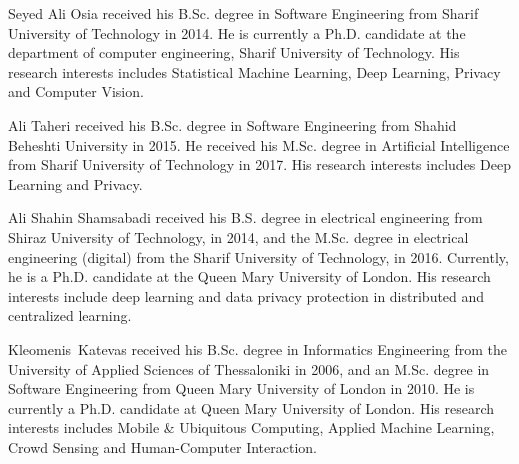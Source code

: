 \documentclass[10pt,journal,compsoc]{IEEEtran}
\begin{document}
\begin{IEEEbiography}{Seyed Ali Osia}
	received his B.Sc. degree in Software Engineering from Sharif University of Technology in 2014. He is currently a Ph.D. candidate at the department of computer engineering, Sharif University of Technology. His research interests includes Statistical Machine Learning, Deep Learning, Privacy and Computer Vision. 
\end{IEEEbiography}
\begin{IEEEbiography}{Ali Taheri}
	received his B.Sc. degree in Software Engineering from Shahid Beheshti University in 2015. He received his M.Sc. degree in Artificial Intelligence from Sharif University of Technology in 2017. His research interests includes Deep Learning and Privacy.
\end{IEEEbiography}
\begin{IEEEbiography}{Ali Shahin Shamsabadi}
	received his B.S. degree in electrical engineering from Shiraz University of Technology, in 2014, and the M.Sc. degree in electrical engineering (digital) from the Sharif University of Technology, in 2016. Currently, he is a Ph.D. candidate at the Queen Mary University of London. His research interests include deep learning and data privacy protection in distributed and centralized learning. 
\end{IEEEbiography}
\begin{IEEEbiography}{Kleomenis~Katevas}
	received his B.Sc. degree in Informatics Engineering from the University of Applied Sciences of Thessaloniki in 2006, and an M.Sc. degree in Software Engineering from Queen Mary University of London in 2010. He is currently a Ph.D. candidate at Queen Mary University of London. His research interests includes Mobile \& Ubiquitous Computing, Applied Machine Learning, Crowd Sensing and Human-Computer Interaction.
\end{IEEEbiography}
\end{document}
